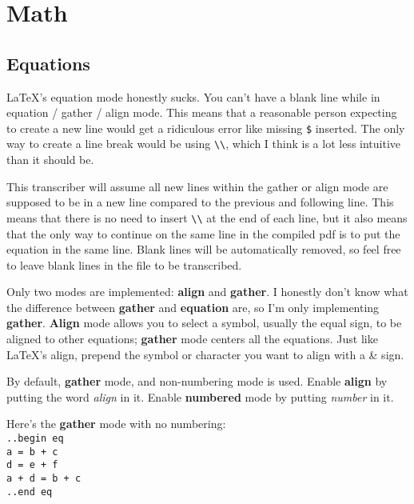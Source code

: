 \documentclass[12pt]{article}
\newcommand{\ital}{\emph }
\newcommand{\nl}{\\}
\renewcommand\bold{\textbf}
\numberwithin{equation}{section}
\begin{document}
\newpage

\section{Math}

\subsection{Equations}

LaTeX's equation mode honestly sucks. You can't have a blank line while in equation / gather / align mode. This means that a reasonable person expecting to create a new line would get a ridiculous error like missing \verb|$| inserted. The only way to create a line break would be using \verb|\\|, which I think is a lot less intuitive than it should be.

\medskip

This transcriber will assume all new lines within the gather or align mode are supposed to be in a new line compared to the previous and following line. This means that there is no need to insert \verb|\\| at the end of each line, but it also means that the only way to continue on the same line in the compiled pdf is to put the equation in the same line. Blank lines will be automatically removed, so feel free to leave blank lines in the file to be transcribed.

\medskip

Only two modes are implemented: \bold{align} and \bold{gather}. I honestly don't know what the difference between \bold{gather} and \bold{equation} are, so I'm only implementing \bold{gather}. \bold{Align} mode allows you to select a symbol, usually the equal sign, to be aligned to other equations; \bold{gather} mode centers all the equations. Just like LaTeX's align, prepend the symbol or character you want to align with a \& sign.

\medskip

By default, \bold{gather} mode, and non-numbering mode is used. Enable \bold{align} by putting the word \ital{align} in it. Enable \bold{numbered} mode by putting \ital{number} in it.

\medskip

\medskip

Here's the \bold{gather} mode with no numbering: \nl
\verb|..begin eq|\nl
\verb|a = b + c|\nl
\verb|d = e + f|\nl
\verb|a + d = b + c|\nl
\verb|..end eq|
\end{document}

